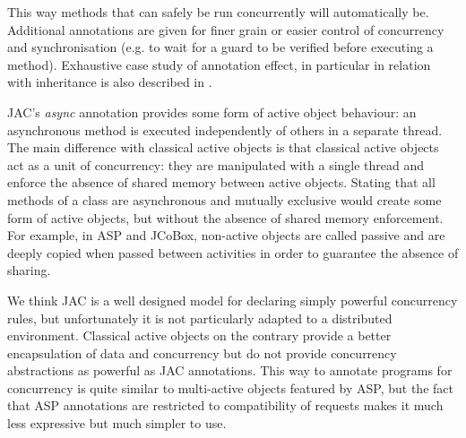 This way methods that can safely be run concurrently will
automatically be. Additional annotations are given for finer grain or
easier control of concurrency and synchronisation (e.g. to wait for a
guard to be verified before executing a method).  Exhaustive case
study of annotation effect, in particular in relation with inheritance
is also described in \cite{lohr2006jac}.

JAC's \emph{async} annotation provides some form of
active object behaviour: an asynchronous method is executed
independently of others in a separate thread. The main difference with
classical active objects is that classical active objects act as a unit of
concurrency: they are manipulated with a single thread and enforce the
absence of shared memory between active objects. Stating that all
methods of a class are asynchronous and mutually exclusive would
create some form of active objects, but without the absence of shared
memory enforcement. For example, in ASP and JCoBox, non-active objects
are called passive and are deeply copied when passed between
activities in order to guarantee the absence of sharing.

\smallskip We think JAC is a well designed model for declaring simply
powerful concurrency rules, but unfortunately it is not particularly
adapted to a distributed environment. Classical active objects on the
contrary provide a better encapsulation of data and concurrency but do
not provide concurrency abstractions as powerful as JAC annotations.
This way to annotate programs for concurrency is quite similar to multi-active objects 
featured by ASP, but the fact that ASP annotations are restricted to compatibility of 
requests makes it much less expressive but much simpler to use.





